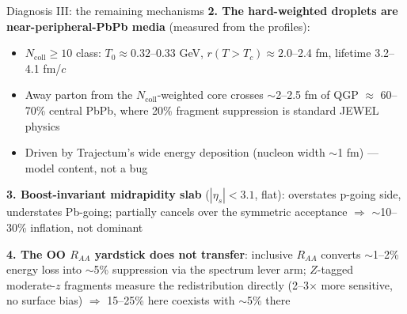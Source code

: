 \documentclass[aspectratio=169]{beamer}
\begin{document}
\begin{frame}[t]{Diagnosis III: the remaining mechanisms}
  \textbf{2. The hard-weighted droplets are near-peripheral-PbPb media} (measured from the profiles):
  \begin{itemize}
    \item $N_\mathrm{coll} \ge 10$ class: $T_0 \approx 0.32$--0.33 GeV, $r(T>T_c) \approx 2.0$--2.4 fm, lifetime 3.2--4.1 fm/$c$
    \item Away parton from the $N_\mathrm{coll}$-weighted core crosses $\sim$2--2.5 fm of QGP $\approx$ 60--70\% central PbPb, where 20\% fragment suppression is standard JEWEL physics
    \item Driven by Trajectum's wide energy deposition (nucleon width $\sim$1 fm) --- model content, not a bug
  \end{itemize}
  \vspace{0.4em}
  \textbf{3. Boost-invariant midrapidity slab} ($|\eta_s| < 3.1$, flat): overstates p-going side, understates Pb-going; partially cancels over the symmetric acceptance $\Rightarrow$ $\sim$10--30\% inflation, not dominant
  \vspace{0.4em}

  \textbf{4. The OO $R_{AA}$ yardstick does not transfer}: inclusive $R_{AA}$ converts $\sim$1--2\% energy loss into $\sim$5\% suppression via the spectrum lever arm; $Z$-tagged moderate-$z$ fragments measure the redistribution directly (2--3$\times$ more sensitive, no surface bias) $\Rightarrow$ 15--25\% here coexists with $\sim$5\% there
\end{frame}
\end{document}
